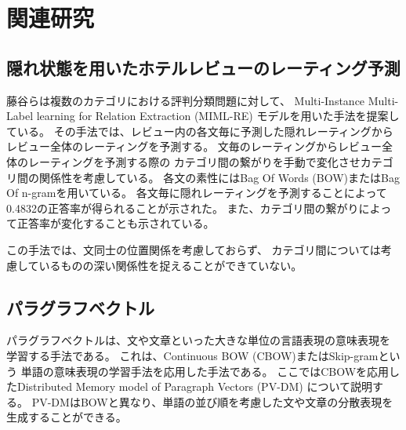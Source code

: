 \documentclass[twocolumn,a4paper]{ltjarticle}
\begin{document}



\section{関連研究}

\subsection{隠れ状態を用いたホテルレビューのレーティング予測}

藤谷ら\cite{fujitani15}は複数のカテゴリにおける評判分類問題に対して、
Multi-Instance Multi-Label learning for Relation Extraction (MIML-RE)
\cite{mihai12}モデルを用いた手法を提案している。
その手法では、レビュー内の各文毎に予測した隠れレーティングから
レビュー全体のレーティングを予測する。
文毎のレーティングからレビュー全体のレーティングを予測する際の
カテゴリ間の繋がりを手動で変化させカテゴリ間の関係性を考慮している。
各文の素性にはBag Of Words (BOW)またはBag Of n-gramを用いている。
各文毎に隠れレーティングを予測することによって
0.4832の正答率が得られることが示された。
また、カテゴリ間の繋がりによって正答率が変化することも示されている。

この手法では、文同士の位置関係を考慮しておらず、
カテゴリ間については考慮しているものの深い関係性を捉えることができていない。


\subsection{パラグラフベクトル}

パラグラフベクトルは、文や文章といった大きな単位の言語表現の意味表現を
学習する手法である。
これは、Continuous BOW (CBOW)またはSkip-gram\cite{yoshua03}という
単語の意味表現の学習手法を応用した手法である。
ここではCBOWを応用したDistributed Memory model of Paragraph Vectors (PV-DM)
について説明する。
PV-DMはBOWと異なり、単語の並び順を考慮した文や文章の分散表現を
生成することができる。
\end{document}
